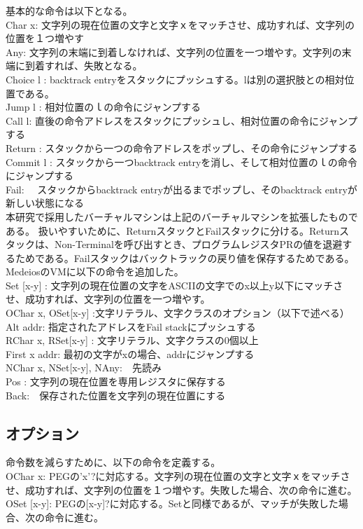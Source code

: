 \documentclass[paper]{ieicej}
\begin{document}
基本的な命令は以下となる。\\
Char x: 文字列の現在位置の文字と文字ｘをマッチさせ、成功すれば、文字列の位置を１つ増やす\\
Any: 文字列の末端に到着しなければ、文字列の位置を一つ増やす。文字列の末端に到着すれば、失敗となる。\\
Choice l : backtrack entryをスタックにプッシュする。lは別の選択肢との相対位置である。\\
Jump l : 相対位置のｌの命令にジャンプする\\
Call l: 直後の命令アドレスをスタックにプッシュし、相対位置の命令にジャンプする\\
Return : スタックから一つの命令アドレスをポップし、その命令にジャンプする\\
Commit l : スタックから一つbacktrack entryを消し、そして相対位置のｌの命令にジャンプする\\
Fail:　 スタックからbacktrack entryが出るまでポップし、そのbacktrack entryが新しい状態になる\\

本研究で採用したバーチャルマシンは上記のバーチャルマシンを拡張したものである。
扱いやすいために、ReturnスタックとFailスタックに分ける。Returnスタックは、Non-Terminalを呼び出すとき、プログラムレジスタPRの値を退避するためである。Failスタックはバックトラックの戻り値を保存するためである。\\

MedeiosのVMに以下の命令を追加した。\\
Set [x-y] : 文字列の現在位置の文字をASCIIの文字でのx以上y以下にマッチさせ、成功すれば、文字列の位置を一つ増やす。\\
 OChar x, OSet[x-y] :文字リテラル、文字クラスのオプション（以下で述べる）\\ 
Alt addr: 指定されたアドレスをFail stackにプッシュする\\
RChar x, RSet[x-y] : 文字リテラル、文字クラスの0個以上\\
First x addr: 最初の文字がxの場合、addrにジャンプする\\
NChar x, NSet[x-y], NAny:　先読み\\
Pos : 文字列の現在位置を専用レジスタに保存する\\
Back:　保存された位置を文字列の現在位置にする\\

\subsection{オプション}
命令数を減らすために、以下の命令を定義する。\\
OChar x: PEGの'x'?に対応する。文字列の現在位置の文字と文字ｘをマッチさせ、成功すれば、文字列の位置を１つ増やす。失敗した場合、次の命令に進む。\\
OSet [x-y]: PEGの[x-y]?に対応する。Setと同様であるが、マッチが失敗した場合、次の命令に進む。\\
\end{document}
